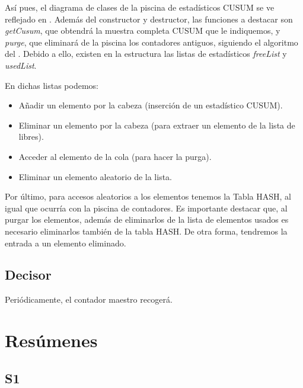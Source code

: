 Así pues, el diagrama de clases de la piscina de estadísticos \gls{CUSUM} se ve reflejado en . 
Además del constructor y destructor, las funciones a destacar son \emph{getCusum}, que obtendrá la muestra completa 
\gls{CUSUM} que le indiquemos, y \emph{purge}, que eliminará de la piscina los contadores antiguos, siguiendo el 
algoritmo del . Debido a ello, existen en la estructura las listas de estadísticos \emph{freeList} 
y \emph{usedList}.

En dichas listas podemos:
\begin{itemize}
 \item Añadir un elemento por la cabeza (inserción de un estadístico CUSUM).
 \item Eliminar un elemento por la cabeza (para extraer un elemento de la lista de libres).
 \item Acceder al elemento de la cola (para hacer la purga).
 \item Eliminar un elemento aleatorio de la lista.
\end{itemize}

Por último, para accesos aleatorios a los elementos tenemos la Tabla HASH, al igual que ocurría con la piscina de 
contadores. Es importante destacar que, al purgar los elementos, además de eliminarlos de la lista de elementos usados 
es necesario eliminarlos también de la tabla HASH. De otra forma, tendremos la entrada a un elemento eliminado.

\subsection{Decisor}
Periódicamente, el contador maestro recogerá.


\section{Resúmenes}%
\begin{Resumen}
\subsection*{S1}
\end{Resumen}

